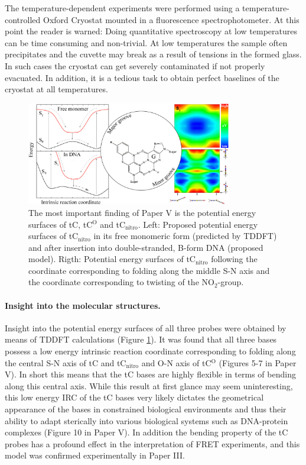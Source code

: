  The temperature-dependent experiments were performed using a temperature-controlled Oxford Cryostat mounted in a fluorescence spectrophotometer. At this point the reader is warned: Doing quantitative spectroscopy at low temperatures can be time consuming and non-trivial. At low temperatures the sample often precipitates and the cuvette may break as a result of tensions in the formed glass. In such cases the cryostat can get severely contaminated if not properly evacuated. In addition, it is a tedious task to obtain perfect baselines of the cryostat at all temperatures.

\begin{figure}
    \centering
        \includegraphics[width=0.8\textwidth]{adds//pccp_fig.jpg}
    \captionsetup{width=.95\textwidth}
    \caption{The most important finding of Paper V is the potential energy surfaces of tC, tC$^\mathrm{O}$ and tC$_\mathrm{nitro}$. Left: Proposed potential energy surfaces of tC$_\mathrm{nitro}$ in its free monomeric form (predicted by TDDFT) and after insertion into double-stranded, B-form DNA (proposed model). Rigth: Potential energy surfaces of tC$_\mathrm{nitro}$ following the coordinate corresponding to folding along the middle S-N axis and the coordinate corresponding to twisting of the NO$_2$-group.}
    \label{Fig:chap_Papers_PCCP}
\end{figure}

 \paragraph{Insight into the molecular structures.} Insight into the potential energy surfaces of all three probes were obtained by means of TDDFT calculations (Figure \ref{Fig:chap_Papers_PCCP}). It was found that all three bases possess a low energy intrinsic reaction coordinate corresponding to folding along the central S-N axis of tC and tC$_\mathrm{nitro}$ and O-N axis of tC$^\mathrm{O}$ (Figures 5-7 in Paper V). In short this means that the tC bases are highly flexible in terms of bending along this central axis. While this result at first glance may seem uninteresting, this low energy IRC of the tC bases very likely dictates the geometrical appearance of the bases in constrained biological environments and thus their ability to adapt sterically into various biological systems such as DNA-protein complexes (Figure 10 in Paper V). In addition the bending property of the tC probes has a profound effect in the interpretation of FRET experiments, and this model was confirmed experimentally in Paper III.

